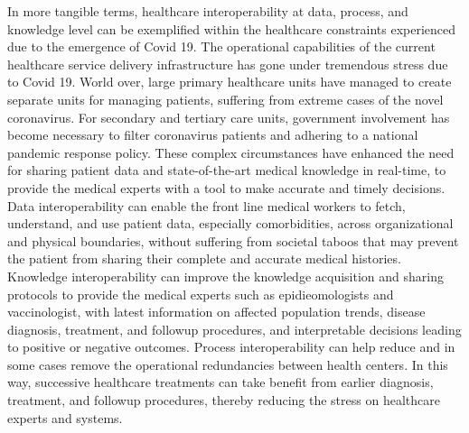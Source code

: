 \documentclass{ieeeaccess}
\begin{document}
In more tangible terms, healthcare interoperability at data, process, and knowledge level can be exemplified within the healthcare constraints experienced due to the emergence of Covid 19. The operational capabilities of the current healthcare service delivery infrastructure has gone under tremendous stress due to Covid 19. World over, large primary healthcare units have managed to create separate units for managing patients, suffering from extreme cases of the novel coronavirus. For secondary and tertiary care units, government involvement has become necessary to filter coronavirus patients and adhering to a national pandemic response policy. 
These complex circumstances have enhanced the need for sharing patient data and state-of-the-art medical knowledge in real-time, to provide the medical experts with a tool to make accurate and timely decisions.
Data interoperability can enable the front line medical workers to fetch, understand, and use patient data, especially comorbidities, across organizational and physical boundaries, without suffering from societal taboos that may prevent the patient from sharing their complete and accurate medical histories. Knowledge interoperability can improve the knowledge acquisition and sharing protocols to provide the medical experts such as epidieomologists and vaccinologist, with latest information on affected population trends, disease diagnosis, treatment, and followup procedures, and interpretable decisions leading to positive or negative outcomes. Process interoperability can help reduce and in some cases remove the operational redundancies between health centers. In this way, successive healthcare treatments can take benefit from earlier diagnosis, treatment, and followup procedures, thereby reducing the stress on healthcare experts and systems. 
\end{document}
